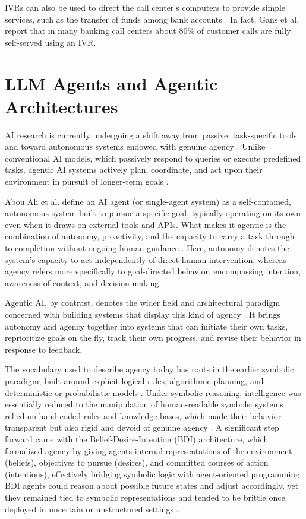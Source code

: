 \documentclass[12pt,a4paper,openright,twoside]{book}
\begin{document}
IVRs can also be used to direct the call center's computers to provide simple services,
such as the transfer of funds among bank accounts \cite{gans2003telephone}.
In fact, Gans et al. report that in many banking call centers
about 80\% of customer calls are fully self-served using an IVR.

\section{LLM Agents and Agentic Architectures}
\label{sec:llm-agents}
AI research is currently undergoing a shift away from passive, task-specific tools and toward autonomous
systems endowed with genuine agency \cite{DBLP:journals/air/AliDC26}. Unlike conventional AI models,
which passively respond to queries or execute predefined tasks, agentic AI systems actively plan, coordinate,
and act upon their environment in pursuit of longer-term goals \cite{DBLP:journals/air/AlvaP26}.

Abou Ali et al. define an AI agent (or single-agent system) as a self-contained, autonomous system built to pursue
a specific goal, typically operating on its own even when it draws on external tools and APIs. What makes it agentic
is the combination of autonomy, proactivity, and the capacity to carry a task through to completion without ongoing human guidance \cite{DBLP:journals/air/AliDC26}.
Here, autonomy denotes the system's capacity to act independently of direct human intervention, whereas agency refers
more specifically to goal-directed behavior, encompassing intention, awareness of context, and decision-making.

Agentic AI, by contrast, denotes the wider field and architectural paradigm concerned with building systems that display
this kind of agency \cite{DBLP:journals/air/AliDC26}. It brings autonomy and agency together into systems that can initiate their own tasks, reprioritize
goals on the fly, track their own progress, and revise their behavior in response to feedback.

The vocabulary used to describe agency today has roots in the earlier symbolic paradigm, built around explicit logical rules,
algorithmic planning, and deterministic or probabilistic models \cite{DBLP:journals/air/AliDC26}. Under symbolic reasoning,
intelligence was essentially reduced to the manipulation of human-readable symbols: systems relied on hand-coded rules and
knowledge bases, which made their behavior transparent but also rigid and devoid of genuine agency \cite{DBLP:journals/access/MorallesCRKSSPSR26}.
A significant step forward came with the Belief-Desire-Intention (BDI) architecture, which formalized agency by giving
agents internal representations of the environment (beliefs), objectives to pursue (desires), and committed courses of action (intentions),
effectively bridging symbolic logic with agent-oriented programming. BDI agents could reason about possible future states
and adjust accordingly, yet they remained tied to symbolic representations and tended to be brittle once deployed in uncertain
or unstructured settings \cite{DBLP:journals/access/MorallesCRKSSPSR26}.
\end{document}

